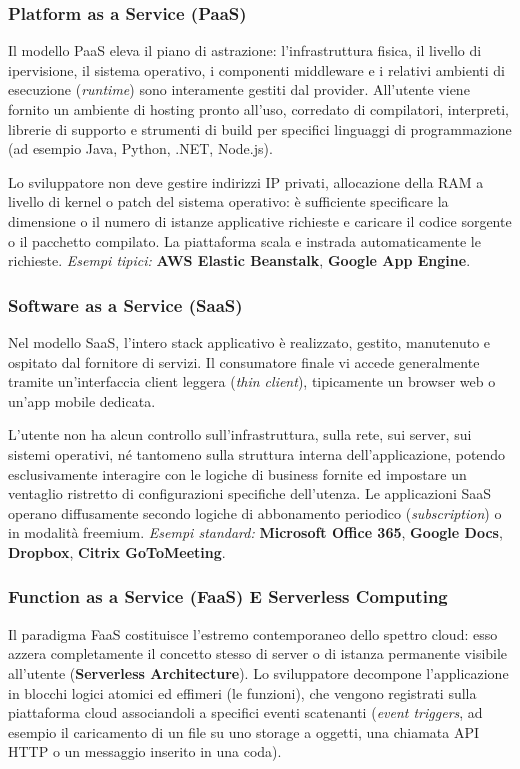 \documentclass[11pt, a4paper]{article}
\begin{document}
\subsubsection{Platform as a Service (PaaS)}
Il modello PaaS eleva il piano di astrazione: l'infrastruttura fisica, il livello di ipervisione, il sistema operativo, i componenti middleware e i relativi ambienti di esecuzione (\emph{runtime}) sono interamente gestiti dal provider. All'utente viene fornito un ambiente di hosting pronto all'uso, corredato di compilatori, interpreti, librerie di supporto e strumenti di build per specifici linguaggi di programmazione (ad esempio Java, Python, .NET, Node.js).

Lo sviluppatore non deve gestire indirizzi IP privati, allocazione della RAM a livello di kernel o patch del sistema operativo: è sufficiente specificare la dimensione o il numero di istanze applicative richieste e caricare il codice sorgente o il pacchetto compilato. La piattaforma scala e instrada automaticamente le richieste.
\emph{Esempi tipici:} \textbf{AWS Elastic Beanstalk}, \textbf{Google App Engine}.

\subsubsection{Software as a Service (SaaS)}
Nel modello SaaS, l'intero stack applicativo è realizzato, gestito, manutenuto e ospitato dal fornitore di servizi. Il consumatore finale vi accede generalmente tramite un'interfaccia client leggera (\emph{thin client}), tipicamente un browser web o un'app mobile dedicata.

L'utente non ha alcun controllo sull'infrastruttura, sulla rete, sui server, sui sistemi operativi, né tantomeno sulla struttura interna dell'applicazione, potendo esclusivamente interagire con le logiche di business fornite ed impostare un ventaglio ristretto di configurazioni specifiche dell'utenza. Le applicazioni SaaS operano diffusamente secondo logiche di abbonamento periodico (\emph{subscription}) o in modalità freemium.
\emph{Esempi standard:} \textbf{Microsoft Office 365}, \textbf{Google Docs}, \textbf{Dropbox}, \textbf{Citrix GoToMeeting}.

\subsubsection{Function as a Service (FaaS) E Serverless Computing}
Il paradigma FaaS costituisce l'estremo contemporaneo dello spettro cloud: esso azzera completamente il concetto stesso di server o di istanza permanente visibile all'utente (\textbf{Serverless Architecture}). Lo sviluppatore decompone l'applicazione in blocchi logici atomici ed effimeri (le funzioni), che vengono registrati sulla piattaforma cloud associandoli a specifici eventi scatenanti (\emph{event triggers}, ad esempio il caricamento di un file su uno storage a oggetti, una chiamata API HTTP o un messaggio inserito in una coda).
\end{document}
